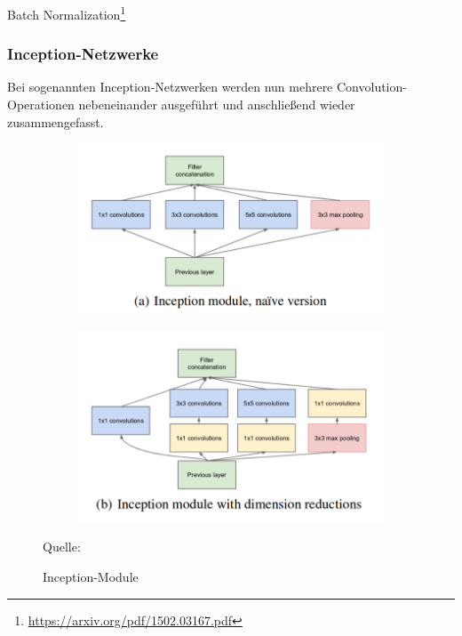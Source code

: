\documentclass[11pt,a4paper]{article}
\newcommand{\source}[1]{\caption*{\hfill Quelle: {#1}} }
\numberwithin{equation}{section}
\begin{document}
	Batch Normalization\footnote{\url{https://arxiv.org/pdf/1502.03167.pdf}}
	
	
	\subsubsection{Inception-Netzwerke}
	Bei sogenannten Inception-Netzwerken werden nun mehrere Convolution-Operationen nebeneinander ausgeführt und anschließend wieder zusammengefasst.
	
	
	
	\begin{figure}
		\centering
		\begin{subfigure}{.5\textwidth}
			\centering
				\includegraphics[width=.7\linewidth]{inception_module_naive.png}
			
		\end{subfigure}%
		\begin{subfigure}{.5\textwidth}
			\centering
			\includegraphics[width=.7\linewidth]{inception_module_advanced.png}
			
		\end{subfigure}
		\caption{Inception-Module}
		\source{\cite{goingdeeperwithconvolutions}}
		
		\label{inception_modules}
	\end{figure}
\end{document}
